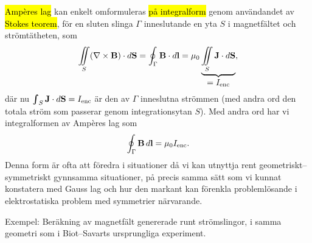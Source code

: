 {{\hl{Amp{\`e}res lag}} kan enkelt omformuleras {\hl{p{\aa} integralform}} genom
anv{\"a}ndandet av {\hl{Stokes teorem}},  f{\"o}r en
sluten slinga $\Gamma$ inneslutande en yta $S$ i magnetf{\"a}ltet och
str{\"o}mt{\"a}theten, som
\hl{$$
  \iint_{S}(\nabla\times{\bf B})\cdot d{\bf S}=
  \oint_{\Gamma}{\bf B}\cdot d{\bf l}=
  \mu_0\underbrace{\iint_{S}{\bf J}\cdot d{\bf S}}_{\displaystyle =I_{\rm enc}},
$$}
d{\"a}r nu $\iint_{S}{\bf J}\cdot d{\bf S}=I_{\rm enc}$ {\"a}r den av $\Gamma$
inneslutna str{\"o}mmen (med andra ord den totala str{\"o}m som passerar genom
integrationsytan $S$). Med andra ord har vi integralformen av Amp{\`e}res lag som
$$
  \oint_{\Gamma}{\bf B}\,d{\bf l}=\mu_0I_{\rm enc}.
$$
Denna form {\"a}r ofta att f{\"o}redra i situationer d{\aa} vi kan utnyttja
rent geometriskt--symmetriskt gynn\-samma situationer, p{\aa} precis samma
s{\"a}tt som vi kunnat konstatera med Gauss lag och hur den markant kan
f{\"o}renkla probleml{\"o}sande i elektrostatiska problem med symmetrier
n{\"a}rvarande.

Exempel: Ber{\"a}kning av magnetf{\"a}lt genererade runt str{\"o}mslingor,
i samma geometri som i Biot--Savarts ursprungliga
experiment.
\vfill\eject

}
